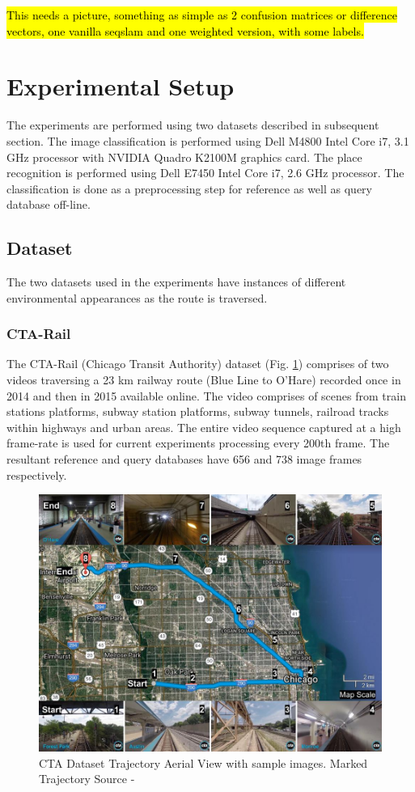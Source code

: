 \documentclass[letterpaper, 10 pt, conference]{ieeeconf}  %
\begin{document}
\hl{This needs a picture, something as simple as 2 confusion matrices or difference vectors, one vanilla seqslam and one weighted version, with some labels. }

\section{Experimental Setup}
The experiments are performed using two datasets described in subsequent section. The image classification is performed using Dell M4800 Intel Core i7, 3.1 GHz processor with NVIDIA Quadro K2100M graphics card. The place recognition is performed using Dell E7450 Intel Core i7, 2.6 GHz processor. The classification is done as a preprocessing step for reference as well as query database off-line.

\subsection{Dataset}
The two datasets used in the experiments have instances of different environmental appearances as the route is traversed.

\subsubsection{CTA-Rail}
The CTA-Rail (Chicago Transit Authority) dataset (Fig. \ref{fig:ctaTraj}) comprises of two videos traversing a 23 km railway route (Blue Line to O'Hare) recorded once in 2014 \cite{ctaRail2014} and then in 2015 \cite{ctaRail2015} available online. The video comprises of scenes from train stations platforms, subway station platforms, subway tunnels, railroad tracks within highways and urban areas. The entire video sequence captured at a high frame-rate is used for current experiments processing every 200th frame. The resultant reference and query databases have 656 and 738 image frames respectively.

\begin{figure}
 \includegraphics[scale=0.25]{cta-datasetTrajSampleImages}
 \caption{CTA Dataset Trajectory Aerial View with sample images. Marked Trajectory Source - \cite{ctaTrajGMap}}
 \label{fig:ctaTraj}
\end{figure}
\end{document}
